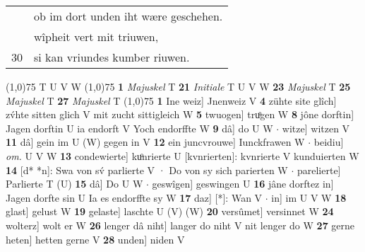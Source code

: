\documentclass[8pt,a4paper,notitlepage]{article}
\begin{document}
\begin{table}[ht]
\begin{minipage}[t]{0.5\linewidth}
\begin{tabular}{rl}
 & ob im dort unden iht wære geschehen.\\ 
 & wîpheit vert mit triuwen,\\ 
30 & si kan vriundes kumber riuwen.\\ 
\end{tabular}
\scriptsize
\line(1,0){75} \newline
T U V W \newline
\line(1,0){75} \newline
\textbf{1} \textit{Majuskel} T  \textbf{21} \textit{Initiale} T U V W  \textbf{23} \textit{Majuskel} T  \textbf{25} \textit{Majuskel} T  \textbf{27} \textit{Majuskel} T  \newline
\line(1,0){75} \newline
\textbf{1} Ine weiz] Jnenweiz V \textbf{4} zühte site glîch] zv́hte sitten glich V mit zucht sittigleich W \textbf{5} twuogen] truͦgen W \textbf{8} jône dorftin] Jagen dorftin U ia endorft V Yoch endorffte W \textbf{9} dâ] do U W  $\cdot$ witze] witzen V \textbf{11} dâ] gein im U (W) gegen in V \textbf{12} ein juncvrouwe] Iunckfrawen W  $\cdot$ beidiu] \textit{om.} U V W \textbf{13} condewierte] kuͦnrierte U [kvnrierten]: kvnrierte V kunduierten W \textbf{14} [d* *n]: Swa von sv́ parlierte V · Do von sy sich parierten W  $\cdot$ parelierte] Parlierte T (U) \textbf{15} dâ] Do U W  $\cdot$ geswîgen] geswingen U \textbf{16} jâne dorftez in] Jagen dorfte sin U Ia es endorffte sy W \textbf{17} daz] [*]: Wan V  $\cdot$ in] im U V W \textbf{18} glast] gelust W \textbf{19} gelaste] laschte U (V) (W) \textbf{20} versûmet] versinnet W \textbf{24} wolterz] wolt er W \textbf{26} lenger dâ niht] langer do niht V nit lenger do W \textbf{27} gerne heten] hetten gerne V \textbf{28} unden] niden V \newline
\end{minipage}
\end{table}
\end{document}
